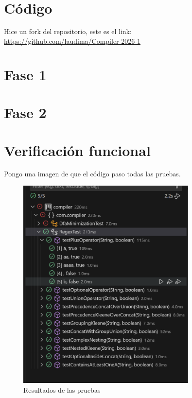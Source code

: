 \documentclass{article}
\begin{document}
    \section{Código}
    Hice un fork del repositorio, este es el link: \url{https://github.com/laudima/Compiler-2026-1}
    \section{Fase 1}

    \section{Fase 2}
    \section{Verificación funcional}

    Pongo una imagen de que el código paso todas las pruebas. 
    \begin{figure}
        \centering
        \includegraphics[width=0.8\textwidth]{images/pruebas.png}
        \caption{Resultados de las pruebas}
        \label{fig:test_results}
    \end{figure}
\end{document}

